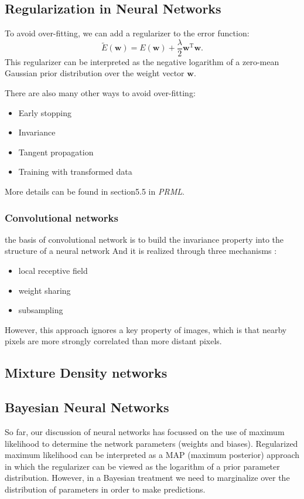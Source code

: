 \documentclass[a4paper]{book}
\newcommand{\mrm}{\mathrm}
\newcommand{\mbf}{\mathbf}
\newcommand{\ww}{\mbf w}
\newcommand{\trans}{^{\mrm T}}
\newcommand{\tit}{\textit}
\begin{document}
\subsection{Regularization in Neural Networks}
To avoid over-fitting, we can add a regularizer to the error function:
\begin{equation}\label{}
  \tilde{E}(\ww) = E(\ww)+\frac{\lambda}{2}\ww\trans\ww.
\end{equation}
This regularizer can be interpreted as the negative logarithm of a zero-mean Gaussian prior distribution over the weight vector $\ww$.

There are also many other ways to avoid over-fitting:
\begin{itemize}
  \item Early stopping
  \item Invariance
  \item Tangent propagation
  \item Training with transformed data
\end{itemize}
More details can be found in section5.5 in \tit{PRML}.
\subsubsection{Convolutional networks}
the basis of  convolutional network is to build the invariance property into the structure of a neural network And it is realized through three mechanisms :
\begin{itemize}
  \item local receptive field
  \item weight sharing
  \item subsampling
\end{itemize}
However, this approach ignores a key property of images, which is that nearby pixels are more strongly correlated than more distant pixels.
\subsection{Mixture Density networks}


\subsection{Bayesian Neural Networks}
So far, our discussion of neural networks has focussed on the use of maximum likelihood to determine the network parameters (weights and biases). Regularized maximum likelihood can be interpreted as a MAP (maximum posterior) approach in which the regularizer can be viewed as the logarithm of a prior parameter distribution. However, in a Bayesian treatment we need to marginalize over the distribution of parameters in order to make predictions.
\end{document}
